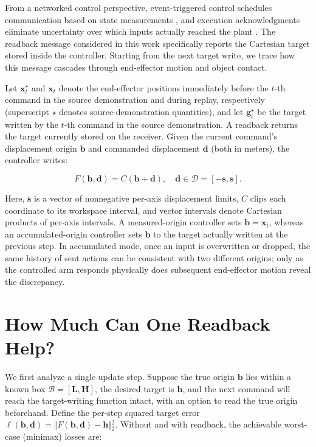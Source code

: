 \documentclass[conference]{IEEEtran}
\begin{document}
From a networked control perspective, event-triggered control schedules communication based on state measurements \citep{ref6}, and execution acknowledgments eliminate uncertainty over which inputs actually reached the plant \citep{ref5}. The readback message considered in this work specifically reports the Cartesian target stored inside the controller. Starting from the next target write, we trace how this message cascades through end-effector motion and object contact.

Let $\mathbf{x}_t^\star$ and $\mathbf{x}_t$ denote the end-effector positions immediately before the $t$-th command in the source demonstration and during replay, respectively (superscript $\star$ denotes source-demonstration quantities), and let $\mathbf{g}_t^\star$ be the target written by the $t$-th command in the source demonstration. A readback returns the target currently stored on the receiver. Given the current command's displacement origin $\mathbf{b}$ and commanded displacement $\mathbf{d}$ (both in meters), the controller writes:

\begin{equation}
F(\mathbf{b},\mathbf{d}) = C(\mathbf{b} + \mathbf{d}), \quad \mathbf{d} \in \mathcal{D} = [-\mathbf{s}, \mathbf{s}].
\label{eq:e1}
\end{equation}

Here, $\mathbf{s}$ is a vector of nonnegative per-axis displacement limits, $C$ clips each coordinate to its workspace interval, and vector intervals denote Cartesian products of per-axis intervals. A measured-origin controller sets $\mathbf{b} = \mathbf{x}_t$, whereas an accumulated-origin controller sets $\mathbf{b}$ to the target actually written at the previous step. In accumulated mode, once an input is overwritten or dropped, the same history of sent actions can be consistent with two different origins; only as the controlled arm responds physically does subsequent end-effector motion reveal the discrepancy.

\section{How Much Can One Readback Help?}\label{sec:theory}

We first analyze a single update step. Suppose the true origin $\mathbf{b}$ lies within a known box $\mathcal{B} = [\mathbf{L}, \mathbf{H}]$, the desired target is $\mathbf{h}$, and the next command will reach the target-writing function intact, with an option to read the true origin beforehand. Define the per-step squared target error $\ell(\mathbf{b}, \mathbf{d}) = \Vert{} F(\mathbf{b}, \mathbf{d}) - \mathbf{h} \Vert{}_2^2$. Without and with readback, the achievable worst-case (minimax) losses are:
\end{document}
